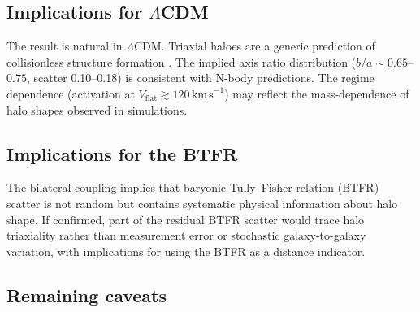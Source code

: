 \documentclass[fleqn,usenatbib]{mnras}
\newcommand{\vflat}{V_\mathrm{flat}}
\newcommand{\kms}{\,\mathrm{km\,s}^{-1}}
\begin{document}
\subsection{Implications for $\Lambda$CDM}

The result is natural in $\Lambda$CDM.
Triaxial haloes are a generic prediction of collisionless structure formation \citep{Allgood2006, VeraCiro2011}.
The implied axis ratio distribution ($b/a \sim 0.65$--$0.75$, scatter 0.10--0.18) is consistent with N-body predictions.
The regime dependence (activation at $\vflat \gtrsim 120\kms$) may reflect the mass-dependence of halo shapes observed in simulations.

\subsection{Implications for the BTFR}

The bilateral coupling implies that baryonic Tully--Fisher relation (BTFR) scatter is not random but contains systematic physical information about halo shape.
If confirmed, part of the residual BTFR scatter would trace halo triaxiality rather than measurement error or stochastic galaxy-to-galaxy variation, with implications for using the BTFR as a distance indicator.

\subsection{Remaining caveats}
\label{sec:caveats}
\end{document}
